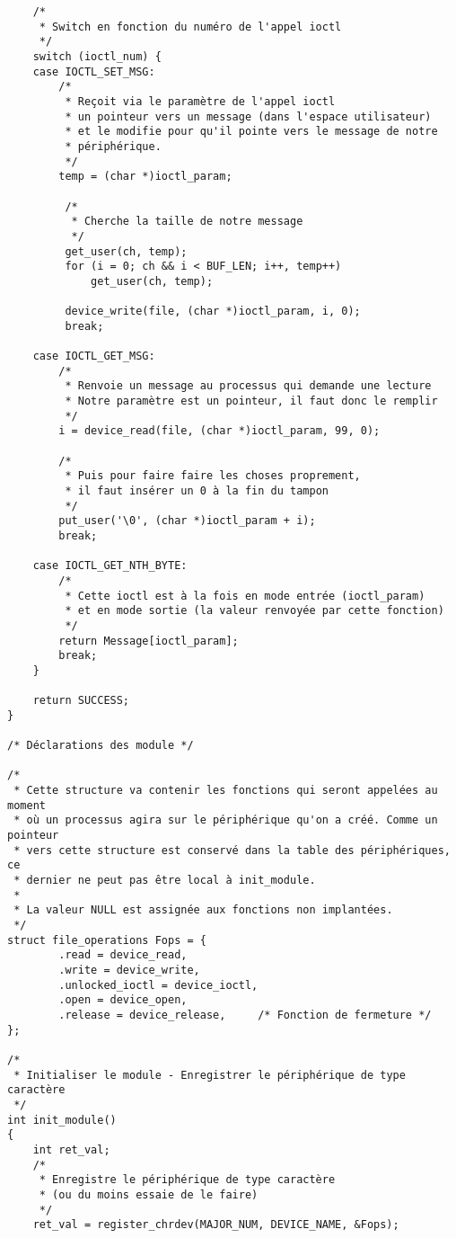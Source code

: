 \documentclass[11pt]{article}
\begin{document}
\begin{verbatim}
    /*
     * Switch en fonction du numéro de l'appel ioctl
     */
    switch (ioctl_num) {
    case IOCTL_SET_MSG:
        /*
         * Reçoit via le paramètre de l'appel ioctl
         * un pointeur vers un message (dans l'espace utilisateur)
         * et le modifie pour qu'il pointe vers le message de notre
         * périphérique.
         */
        temp = (char *)ioctl_param;

         /*
          * Cherche la taille de notre message
          */
         get_user(ch, temp);
         for (i = 0; ch && i < BUF_LEN; i++, temp++)
             get_user(ch, temp);

         device_write(file, (char *)ioctl_param, i, 0);
         break;

    case IOCTL_GET_MSG:
        /*
         * Renvoie un message au processus qui demande une lecture
         * Notre paramètre est un pointeur, il faut donc le remplir
         */
        i = device_read(file, (char *)ioctl_param, 99, 0);

        /*
         * Puis pour faire faire les choses proprement,
         * il faut insérer un 0 à la fin du tampon
         */
        put_user('\0', (char *)ioctl_param + i);
        break;

    case IOCTL_GET_NTH_BYTE:
        /*
         * Cette ioctl est à la fois en mode entrée (ioctl_param)
         * et en mode sortie (la valeur renvoyée par cette fonction)
         */
        return Message[ioctl_param];
        break;
    }

    return SUCCESS;
}

/* Déclarations des module */

/*
 * Cette structure va contenir les fonctions qui seront appelées au moment
 * où un processus agira sur le périphérique qu'on a créé. Comme un pointeur
 * vers cette structure est conservé dans la table des périphériques, ce
 * dernier ne peut pas être local à init_module.
 *
 * La valeur NULL est assignée aux fonctions non implantées.
 */
struct file_operations Fops = {
        .read = device_read,
        .write = device_write,
        .unlocked_ioctl = device_ioctl,
        .open = device_open,
        .release = device_release,     /* Fonction de fermeture */
};

/*
 * Initialiser le module - Enregistrer le périphérique de type caractère
 */
int init_module()
{
    int ret_val;
    /*
     * Enregistre le périphérique de type caractère
     * (ou du moins essaie de le faire)
     */
    ret_val = register_chrdev(MAJOR_NUM, DEVICE_NAME, &Fops);


\end{verbatim}
\end{document}
